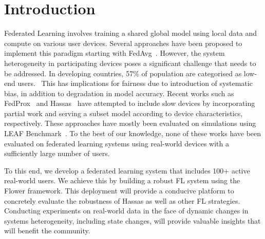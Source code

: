 \section{Introduction}
    Federated Learning involves training a shared global model using local data and compute on various user devices.
    Several approaches have been proposed to implement this paradigm starting with FedAvg~\cite{DBLP:journals/corr/McMahanMRA16}.
    However, the system heterogeneity in participating devices poses a significant challenge that needs to be addressed. In developing countries, 57\% of population are categorised as low-end users.~\cite{10.1145/3446382.3448652}
    This has implications for fairness due to introduction of systematic bias, in addition to degradation in model accuracy.
    Recent works such as FedProx~\cite{DBLP:journals/corr/abs-1812-06127} and Hassas~\cite{DBLP:journals/corr/abs-2110-14205} have attempted to include slow devices by incorporating partial work and serving a subset model according to device characteristics, respectively. 
    These approaches have mostly been evaluated on simulations using LEAF Benchmark~\cite{DBLP:journals/corr/abs-1812-01097}.
    To the best of our knowledge, none of these works have been evaluated on federated learning systems using real-world devices with a sufficiently large number of users. \newline

    To this end, we develop a federated learning system that includes 100+ active real-world users. We achieve this by building a robust FL system using the Flower framework. This deployment will provide a conducive platform to concretely evaluate the robustness of Hassas as well as other FL strategies. Conducting experiments on real-world data in the face of dynamic changes in systems heterogeneity, including state changes, will provide valuable insights that will benefit the community.